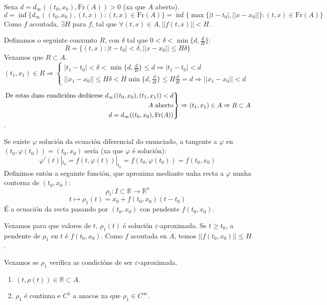 \documentclass[11pt, a4paper,twoside]{article}
\makeatletter
\theoremstyle{theorem-style}  %
\renewenvironment{proof}[1][\proofname]{\par
	\pushQED{\qed}%
	\normalfont \topsep6\p@\@plus6\p@\relax
	\list{}{%
		\settowidth{\leftmargin}{\quad:\hskip\labelsep}%
		\setlength{\labelwidth}{0pt}%
		\setlength{\itemindent}{-\leftmargin}%
	}%
	\item[\hskip\labelsep\itshape#1\@addpunct{:}]\ignorespaces
}{%
	\popQED\endlist\@endpefalse
}
\theoremstyle{definition-style}
\theoremstyle{example-style}
\newenvironment{rcases}
{\left.\begin{aligned}}
	{\end{aligned}\right\rbrace}
\makeatother
\begin{document}
\begin{proof}
	Sexa $ d=d_\infty((t_0, x_0), \text{Fr} (A))>0 $ (xa que $ A $ aberto).
	\[ d=\inf \{d_\infty ( (t_0,x_0), (t,x)):(t,x)\in \text{Fr} (A) \}=\inf \{\max \{|t-t_0|,||x-x_0||\}:(t,x)\in \text{Fr} (A)\}\]
	Como $ f $ acoutada, $ \exists H $ para $ f $, tal que $ \forall(t,x) \in A, ||f(t,x)||<H $.
	
	Definamos o seguinte conxunto $ R $, con $ \delta $ tal que $ 0<\delta<\min \{d, \frac{d}{H}\} $:
	\[ R=\{(t,x):|t-t_0|<\delta, ||x-x_0||\leq H\delta\} \]
	Vexamos que $ R \subset A $. $ (t_1,x_1)\in R \Rightarrow \begin{cases}
	|t_1-t_0|<\delta<\min\{d,\frac{d}{H}\}\leq d\Rightarrow |t_1-t_0|<d\\
	||x_1-x_0||\leq H\delta<H\min\{d,\frac{d}{H}\}\leq H \frac{d}{H}=d \Rightarrow ||x_1-x_0||<d
	\end{cases}$  
	
	$\begin{rcases}
	\text{De estas duas condicións dedúcese } d_\infty ( (t_0,x_0), (t_1,x_1)) <d\\
	A \text{ aberto}\\
	d=d_\infty((t_0, x_0), \text{Fr} (A))
	\end{rcases} \Rightarrow (t_1,x_1)\in A \Rightarrow R \subset A$.
	
	Se existe $ \varphi $ solución da ecuación diferencial do enunciado, a tangente a $ \varphi $ en $ (t_0,\varphi(t_0))=(t_0,x_0) $ sería (xa que $ \varphi $ é solución):
	\[ \varphi'(t)|_{t_0}=f(t, \varphi(t))|_{t_0}=f(t_0,\varphi (t_0))=f(t_0,x_0) \]
	Definimos entón a seguinte función, que aproxima mediante unha recta a $ \varphi $ nunha contorna de $ (t_0,x_0) $: 
	\[ \rho_1:I\subset \mathbb{R}\longrightarrow \mathbb{R}^n \]
	\[ t \mapsto \rho_1(t)=x_0+f(t_0,x_0)(t-t_0) \]
	É a ecuación da recta pasando por $ (t_0,x_0) $ con pendente $ f(t_0,x_0) $.
	
	Vexamos para que valores de $ t $, $ \rho_1(t) $ é solución $ \varepsilon $-aproximada. 
	Se $ t\geq t_0 $, a pendente de $ \rho_1 $ en $ t $ é $ f(t_0,x_0) $.
	Como $ f $ acoutada en $ A $, temos $ ||f(t_0,x_0)||\leq H $.
	
	Vexamos se $ \rho_1 $ verifica as condicións de ser $ \varepsilon $-aproximada.
	\begin{enumerate}[\qquad i)]
		\item  $ (t,\rho(t)) \in \mathbb{R}\subset A$.
		
		\item $ \rho_1 $ é continua e $ C^1 $ a anacos xa que $ \rho_1 \in C^\infty $.
		

\end{enumerate}
\end{proof}
\end{document}
